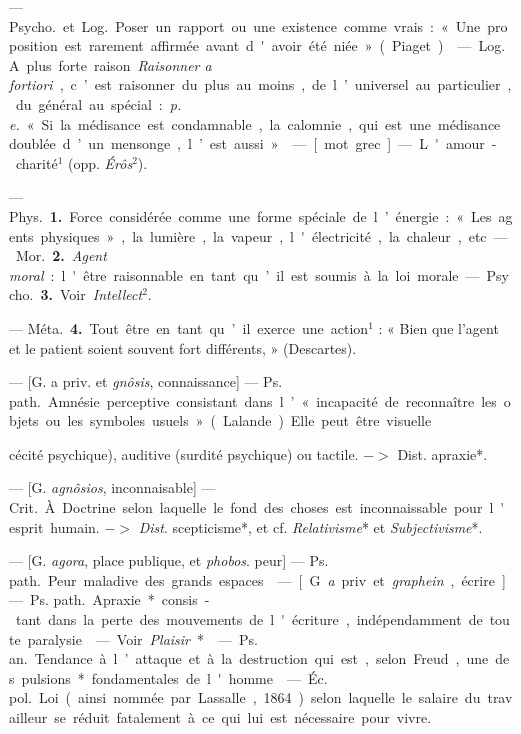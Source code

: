 \begin{itemize}[leftmargin=1cm, label=, itemsep=1pt]
 — \si{Psycho.} et \si{Log.} Poser
un rapport ou une existence comme
vrais : « Une proposition est rarement
affirmée avant d'avoir été niée »
(Piaget).

 — \si{Log.} A plus forte raison.
{\it Raisonner a fortiori}, c’est raisonner
du plus au moins, de l’universel au
particulier, du général au spécial :
{\it p. e.} « Si la médisance est condamnable,
 la calomnie, qui est une médisance
doublée d’un mensonge, l’est aussi ».

 — [mot grec] — L'amour-charité$^1$
(opp. {\it Érôs}$^2$).

 — \si{Phys.} {\bf 1.} Force considérée
comme une forme spéciale de l’énergie : « Les agents physiques », la
lumière, la vapeur, l'électricité, la
chaleur, etc.

— \si{Mor.} {\bf 2.} {\it Agent moral} : l'être
raisonnable en tant qu’il est soumis
à la loi morale.

— \si{Psycho.} {\bf 3.} Voir {\it Intellect}$^2$.

— \si{Méta.} {\bf 4.} Tout être en tant
qu’il exerce une action$^1$ : « Bien
que l'agent et le patient soient souvent fort différents, » (Descartes).

 — [G. a priv. et {\it gnôsis}, connaissance] — \si{Ps. path.} Amnésie
perceptive consistant dans l’ « incapacité de reconnaître les objets ou les
symboles usuels » (Lalande). Elle
peut être visuelle {cécité psychique),
auditive (surdité psychique) ou tactile. $->$ Dist. apraxie*.

 — [G. {\it agnôsios}, inconnaisable]
— \si{Crit.} À Doctrine selon
laquelle le fond des choses est
inconnaissable pour l'esprit humain.
$->$ {\it Dist}. scepticisme*, et cf. {\it Relativisme}* et {\it Subjectivisme}*.

 — [G. {\it agora}, place publique,
et {\it phobos}. peur] — \si{Ps. path.} Peur
maladive des grands espaces.

 — [G. {\it a} priv. et {\it graphein},
écrire] — \si{Ps. path.} Apraxie* consis-
tant dans la perte des mouvements
de l'écriture, indépendamment de
toute paralysie.

 — Voir {\it Plaisir}*.

 — \si{Ps. an.} Tendance à
l’attaque et à la destruction qui est,
selon Freud, une des pulsions* fondamentales de l'homme.

 — \si{Éc. pol.} Loi (ainsi
nommée par Lassalle, 1864) selon
laquelle le salaire du travailleur se
réduit fatalement à ce qui lui est
nécessaire pour vivre.

}
\end{itemize}
